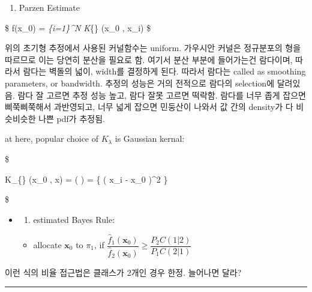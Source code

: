 \documentclass[
]{book}
\providecommand{\tightlist}{%
  \setlength{\itemsep}{0pt}\setlength{\parskip}{0pt}}
\begin{document}
{{{\begin{enumerate}
  이동 히스토그램
  람다는 벽돌 하나의 넓이이며, 람다값이 달라지면 추정된 pdf의 형 또한 조금씩 바뀔 수 있음

  \$
  \hat f(\pmb x\_0) = 
  \$

  this estimate is bumpy. 더 발전된 추정법을 찾아내자. 개선된 추정법:
\item
  Parzen Estimate
\end{enumerate}

\$
\hat f(\pmb x\_0) =  \sum\emph{\{i=1\}\^{}N K}\{\lambda\} (x\_0 , \pmb x\_i)
\$

위의 초기형 추정에서 사용된 커널함수는 uniform. 가우시안 커널은 정규분포의 형을 따르므로 이는 당연히 분산을 필요로 함. 여기서 분산 부분에 들어가는건 람다이며, 따라서 람다는 벽돌의 넓이, width를 결정하게 된다. 따라서 람다는 called as smoothing parameters, or bandwidth. 추정의 성능은 거의 전적으로 람다의 selection에 달려있음. 람다 잘 고르면 추정 성능 높고, 람다 잘못 고르면 떡락함. 람다를 너무 좁게 잡으면 삐쭉삐쭉해서 과반영되고, 너무 넓게 잡으면 민둥산이 나와서 값 간의 density가 다 비슷비슷한 나쁜 pdf가 추정됨.

at here, popular choice of \(K_{\lambda}\) is Gaussian kernal:

\$

K\_\{\lambda\} (x\_0 , x) = \Psi \left(  \right) =  \exp \left\{  ( \vert \vert \pmb x\_i - \pmb x\_0 \vert \vert )\^{}2 \right\}

\$

\begin{itemize}
\item
  \begin{enumerate}
  \def\labelenumi{\arabic{enumi})}
  \setcounter{enumi}{2}
  \tightlist
  \item
    estimated Bayes Rule:
  \end{enumerate}

  \begin{itemize}
  \tightlist
  \item
    allocate \(\pmb x_0\) to \(\pi_1\), if \(\dfrac{\hat f_1 (\pmb x_0)}{\hat f_2 (\pmb x_0)} \ge \dfrac{P_2 C(1 \vert 2)}{P_1 C(2 \vert 1)}\)
  \end{itemize}
\end{itemize}

이런 식의 비율 접근법은 클래스가 2개인 경우 한정. 늘어나면 달라?

\begin{center}\rule{0.5\linewidth}{0.5pt}\end{center}

}}}
\end{document}
